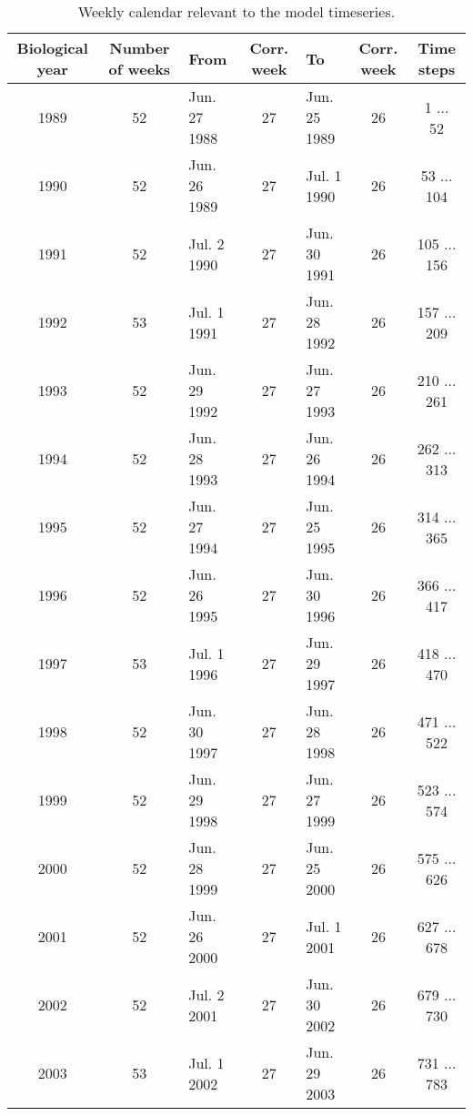 

\begin{table}[ht]
\begin{center}

\caption{Weekly calendar relevant to the model timeseries.}
\label{Tab:Calendar}

\begin{tabular}{cclclcc}
  \toprule
Biological year & Number of weeks & From & Corr. week & To & Corr. week & Time steps \\
  \midrule
1989 & 52 & Jun. 27 1988 & 27 & Jun. 25 1989 & 26 &    1 $\ldots$   52 \\
1990 & 52 & Jun. 26 1989 & 27 & Jul.  1 1990 & 26 &   53 $\ldots$  104 \\
1991 & 52 & Jul.  2 1990 & 27 & Jun. 30 1991 & 26 &  105 $\ldots$  156 \\
1992 & 53 & Jul.  1 1991 & 27 & Jun. 28 1992 & 26 &  157 $\ldots$  209 \\
1993 & 52 & Jun. 29 1992 & 27 & Jun. 27 1993 & 26 &  210 $\ldots$  261 \\
1994 & 52 & Jun. 28 1993 & 27 & Jun. 26 1994 & 26 &  262 $\ldots$  313 \\
1995 & 52 & Jun. 27 1994 & 27 & Jun. 25 1995 & 26 &  314 $\ldots$  365 \\
1996 & 52 & Jun. 26 1995 & 27 & Jun. 30 1996 & 26 &  366 $\ldots$  417 \\
1997 & 53 & Jul.  1 1996 & 27 & Jun. 29 1997 & 26 &  418 $\ldots$  470 \\
1998 & 52 & Jun. 30 1997 & 27 & Jun. 28 1998 & 26 &  471 $\ldots$  522 \\
1999 & 52 & Jun. 29 1998 & 27 & Jun. 27 1999 & 26 &  523 $\ldots$  574 \\
2000 & 52 & Jun. 28 1999 & 27 & Jun. 25 2000 & 26 &  575 $\ldots$  626 \\
2001 & 52 & Jun. 26 2000 & 27 & Jul.  1 2001 & 26 &  627 $\ldots$  678 \\
2002 & 52 & Jul.  2 2001 & 27 & Jun. 30 2002 & 26 &  679 $\ldots$  730 \\
2003 & 53 & Jul.  1 2002 & 27 & Jun. 29 2003 & 26 &  731 $\ldots$  783 \\

\end{tabular}
\end{center}
\end{table}
